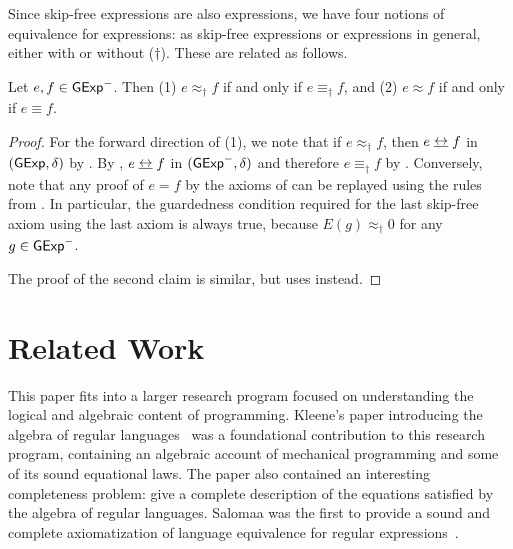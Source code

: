 \documentclass[orivec,envcountsect,envcountsame]{llncs}
\begin{document}
Since skip-free \GKAT expressions are also \GKAT expressions, we have four notions of equivalence for \GKAT expressions: as skip-free expressions or \GKAT expressions in general, either with or without ($\dagger$).
These are related as follows.

\begin{theorem}
    Let $e, f \in \mathsf{GExp}^-$.
    Then (1) $e \approx_\dagger f$ if and only if $e \equiv_\dagger f$, and (2) $e \approx f$ if and only if $e \equiv f$.
\end{theorem}

\begin{proof}
    For the forward direction of (1), we note that if $e \approx_\dagger f$, then $e \bisim f$ in \((\mathsf{GExp}, \delta)\) by .
    By , $e \bisim f$ in \((\mathsf{GExp}^-, \delta)\) and therefore $e \equiv_\dagger f$ by .
    Conversely, note that any proof of $e = f$ by the axioms of  can be replayed using the rules from .
    In particular, the guardedness condition required for the last skip-free \GKAT axiom using the last \GKAT axiom is always true, because $E(g) \approx_\dagger 0$ for any $g \in \mathsf{GExp}^-$.

    The proof of the second claim is similar, but uses  instead.
\end{proof}

\section{Related Work}

This paper fits into a larger research program focused on understanding the logical and algebraic content of programming.
Kleene's paper introducing the algebra of regular languages~\cite{kleene} was a foundational contribution to this research program, containing an algebraic account of mechanical programming and some of its sound equational laws.
The paper also contained an interesting completeness problem: give a complete description of the equations satisfied by the algebra of regular languages.
Salomaa was the first to provide a sound and complete axiomatization of language equivalence for regular expressions~\cite{salomaa}.
\end{document}
